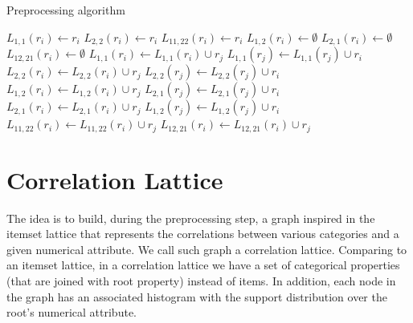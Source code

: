 \begin{algorithm}[h!]
  \caption{Preprocessing algorithm}

     {
      $L_{1,1}(r_i) \leftarrow r_i$\;
      $L_{2,2}(r_i) \leftarrow r_i$\;
      $L_{11,22}(r_i) \leftarrow r_i$\;
      $L_{1,2}(r_i) \leftarrow \emptyset$\;
      $L_{2,1}(r_i) \leftarrow \emptyset$\;
      $L_{12,21}(r_i) \leftarrow \emptyset$\;
    }
     {
	 {
	     {
		$L_{1,1}(r_i) \leftarrow L_{1,1}(r_i) \cup r_j$\;
		$L_{1,1}(r_j) \leftarrow L_{1,1}(r_j) \cup r_i$\;
	    }
	     {
		$L_{2,2}(r_i) \leftarrow L_{2,2}(r_i) \cup r_j$\;
		$L_{2,2}(r_j) \leftarrow L_{2,2}(r_j) \cup r_i$\;
	    }
	     {
		$L_{1,2}(r_i) \leftarrow L_{1,2}(r_i) \cup r_j$\;
		$L_{2,1}(r_j) \leftarrow L_{2,1}(r_j) \cup r_i$\;
	    }
	     {
		$L_{2,1}(r_i) \leftarrow L_{2,1}(r_i) \cup r_j$\;
		$L_{1,2}(r_j) \leftarrow L_{1,2}(r_j) \cup r_i$\;
	    }
	}
   }
    {
	 {
	     {
		$L_{11,22}(r_i) \leftarrow L_{11,22}(r_i) \cup r_j$\;
	    }
	}
	 {
	     {
		$L_{12,21}(r_i) \leftarrow L_{12,21}(r_i) \cup r_j$\;
	    }
	}
   }
  \label{alg3}
\end{algorithm}

\section{Correlation Lattice}
\label{sec:correlation-lattice}

The idea is to build, during the preprocessing step, a graph inspired in the itemset lattice that represents the
correlations between various categories and a given numerical attribute. We call such graph a
correlation lattice.
Comparing to an itemset lattice, in a correlation lattice we have a set of categorical properties (that are joined with
root property) instead of items. In addition, each node in the graph has an associated histogram with the support
distribution over the root's numerical attribute.

